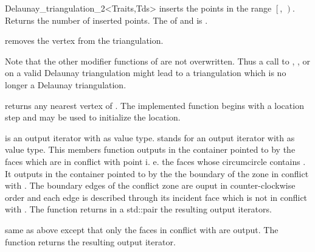 \begin{ccRefClass}{Delaunay_triangulation_2<Traits,Tds>}
{inserts the points in the range
 $\left[\right.$, $\left.\right)$.
 Returns the number of inserted points.
 \ccPrecond The  of  and 
 is .}



{removes the vertex from the triangulation.}

Note that the other modifier functions  of
 are not overwritten.
Thus a  call to 
, ,
  or 
on a valid Delaunay triangulation might lead to a triangulation
which is no longer a Delaunay triangulation.


{returns any nearest vertex of . The implemented function
begins with a location step and
 may be used to initialize the location.}

{  is an output iterator with  as value type.
 stands for an output iterator with  as value type.
This members function outputs in the container pointed to by 
the faces which are in conflict with point 
i. e. the faces whose circumcircle contains .
It outputs in the container pointed to by  the 
the boundary of the zone in conflict with .
The boundary edges
of the conflict  zone are ouput in counter-clockwise order
and each edge is described  through its incident face
which is not in conflict with .
The function returns in a std::pair the resulting output iterators.}

{same as above except that only the faces in conflict with 
are output. The function returns the resulting output iterator.}


\end{ccRefClass}
